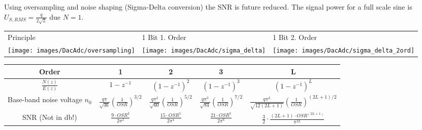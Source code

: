 Using oversampling and noise shaping (Sigma-Delta conversion) the SNR is future reduced. The signal power for a full scale sine is $U_{S,RMS} = \frac{q}{2\sqrt{2}}$ due $N = 1$.\\

\begin{tabular}{m{6cm} m{5cm} m{5cm}}
 	Principle & 1 Bit 1. Order & 1 Bit 2. Order \\ 
	\texttt{[image: images/DacAdc/oversampling]} & 
	\texttt{[image: images/DacAdc/sigma\_delta]} &
	\texttt{[image: images/DacAdc/sigma\_delta\_2ord]} \\ 
\end{tabular}

\begin{tabular}{|c|c|c|c|c|}
\hline Order & 1 & 2 & 3 & L \\ 
\hline $\frac{N(z)}{E(z)}$ & $1-z^{-1}$ & $(1-z^{-1})^2$ & $(1-z^{-1})^3$ & $(1-z^{-1})^L$ \\ 
\hline Base-band noise voltage $n_0$ & $\frac{q \pi}{\sqrt{36}} \left( \frac{1}{OSR} \right)^{3/2} $ & $\frac{q \pi^2}{\sqrt{60}} \left( \frac{1}{OSR} \right)^{5/2}$ & $\frac{q \pi^3}{\sqrt{84}} \left( \frac{1}{OSR} \right)^{7/2} $ & $\frac{q \pi^L}{\sqrt{12(2L+1)}} \left( \frac{1}{OSR} \right)^{(2L+1)/2}$ \\ 
\hline SNR (Not in db!) & $\frac{9 \cdot OSR^3}{2\pi^2}$ & $\frac{15 \cdot OSR^5}{2\pi^4}$ & $\frac{21 \cdot OSR^7 }{2\pi^6}$ & $\frac{3}{2} \cdot \frac{(2L+1) \cdot OSR^{(2L+1)}}{\pi^{2L}}$  \\ 
\hline 
\end{tabular} 